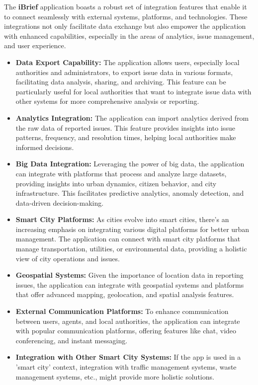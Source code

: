 The \textbf{iBrief} application boasts a robust set of integration features that enable it to connect seamlessly with external systems, platforms, and technologies. These integrations not only facilitate data exchange but also empower the application with enhanced capabilities, especially in the areas of analytics, issue management, and user experience.

\begin{itemize}
    \item \textbf{Data Export Capability:}
    The application allows users, especially local authorities and administrators, to export issue data in various formats, facilitating data analysis, sharing, and archiving. This feature can be particularly useful for local authorities that want to integrate issue data with other systems for more comprehensive analysis or reporting.
    
    \item \textbf{Analytics Integration:}
    The application can import analytics derived from the raw data of reported issues. This feature provides insights into issue patterns, frequency, and resolution times, helping local authorities make informed decisions.
    
    \item \textbf{Big Data Integration:}
    Leveraging the power of big data, the application can integrate with platforms that process and analyze large datasets, providing insights into urban dynamics, citizen behavior, and city infrastructure. This facilitates predictive analytics, anomaly detection, and data-driven decision-making.
    
    \item \textbf{Smart City Platforms:}
    As cities evolve into smart cities, there's an increasing emphasis on integrating various digital platforms for better urban management. The application can connect with smart city platforms that manage transportation, utilities, or environmental data, providing a holistic view of city operations and issues.
    
    \item \textbf{Geospatial Systems:}
    Given the importance of location data in reporting issues, the application can integrate with geospatial systems and platforms that offer advanced mapping, geolocation, and spatial analysis features.
    
    \item \textbf{External Communication Platforms:}
    To enhance communication between users, agents, and local authorities, the application can integrate with popular communication platforms, offering features like chat, video conferencing, and instant messaging.

    \item \textbf{Integration with Other Smart City Systems:} If the app is used in a 'smart city' context, integration with traffic management systems, waste management systems, etc., might provide more holistic solutions.
\end{itemize}

